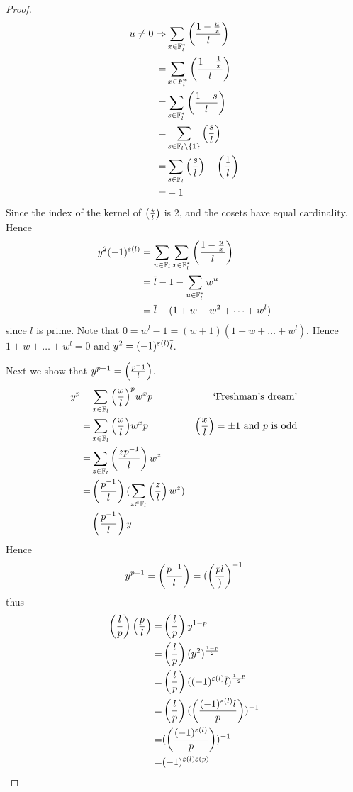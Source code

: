 \begin{proof}
    \begin{align*}
        u \ne 0 \Rightarrow &\sum_{x \in \mathbb{F}_l^*} \left(\frac{1 - \frac{u}{x}}{l}\right)\\
            = &\sum_{x \in F_l^*} \left(\frac{1 - \frac{1}{x}}{l}\right)\\
            = &\sum_{s \in \mathbb{F}_l^*} \left(\frac{1 - s}{l}\right)\\
            = &\sum_{s \in \mathbb{F}_l \setminus \left\{1\right\}} \left(\frac{s}{l}\right)\\
            = &\sum_{s \in \mathbb{F}_l} \left(\frac{s}{l}\right) - \left(\frac{1}{l}\right)\\
            = & - 1 
    \end{align*}
    Since the index of the kernel of $\left(\frac{\star}{l}\right)$ is $2$,
    and the cosets have equal cardinality.
    Hence 
    \begin{align*}
        y^2 (-1)^{\varepsilon(l)} &= \sum_{u \in \mathbb{F}_l}  \sum_{x \in \mathbb{F}_l^*}
            \left(\frac{1 - \frac{u}{x}}{l}\right)\\
            &= \overline{l} - 1 - \sum_{u \in \mathbb{F}_l^*} w^u\\
            &= \overline{l} - (1 + w + w^2 + \dots + w^l)
    \end{align*}
    since $l$ is prime. 
    Note that $0 = w^l - 1 = (w+1)(1+w + \dots + w^l)$.
    Hence $1+w + \dots + w^l = 0$ and $y^2 = (-1)^{\varepsilon(l)} \overline{l}$.

    Next we show that $y^{p - 1} = \left(\frac{p^-1}{l}\right)$.
    \begin{align*}
        y^p = & \sum_{x \in \mathbb{F}_l} {\left(\frac{x}{l}\right)}^p w^xp & \text{ `Freshman's dream'}\\
            = & \sum_{x \in \mathbb{F}_l} {\left(\frac{x}{l}\right)} w^xp & 
            \left(\frac{x}{l}\right)= \pm 1 \text{ and } p \text{ is odd}\\
            = & \sum_{z \in \mathbb{F}_l} \left(\frac{z p^{-1}}{l}\right) w^z\\
            = & \left(\frac{p^{-1}}{l}\right)(\sum_{z \in \mathbb{F}_l} \left(\frac{z}{l}\right) w^z)\\
            = & \left(\frac{p^{-1}}{l}\right) y
    \end{align*}
    Hence \[y^{p - 1} = \left(\frac{p^{-1}}{l}\right) = (\left(\frac{p{l}}{)}\right)^{-1}\]
    thus 
    \begin{align*}
        \left(\frac{l}{p}\right)\left(\frac{p}{l}\right) =& \left(\frac{l}{p}\right) y^{1 - p}\\
        =& \left(\frac{l}{p}\right) (y^2)^{\frac{1 - p}{2}}\\
        =& \left(\frac{l}{p}\right) ((-1)^{\varepsilon(l)} \overline{l})^{\frac{1 - p}{2}}\\
        =& \left(\frac{l}{p}\right) (\left(\frac{(-1)^{\varepsilon(l)}l}{p}\right))^{-1}\\
        =& (\left(\frac{(-1)^{\varepsilon(l)}}{p}\right))^{-1}\\
        =& (-1)^{\varepsilon(l)\varepsilon(p)}
    \end{align*}
\end{proof}